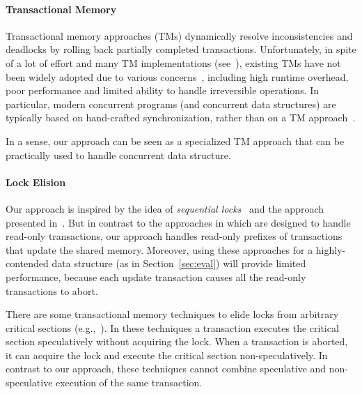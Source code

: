 \paragraph{Transactional Memory}
Transactional memory approaches (TMs) dynamically resolve inconsistencies
and deadlocks by rolling back partially completed transactions.
%
Unfortunately, in spite of a lot of effort and many TM implementations (see~\cite{HLR:SLCA2010}), existing TMs
have not been widely adopted due to various concerns~\cite{DuffyTM2010,Cascaval:2008,mckenneyParallel}, including high runtime overhead,
poor performance and limited ability to handle irreversible operations.
In particular, modern concurrent programs (and concurrent data structures) are typically based on hand-crafted synchronization, rather than  on a TM approach~\cite{Ohad:OOPSLA11}.

In a sense, our approach can be seen as a specialized TM approach that can be practically used to handle concurrent data structure.


\paragraph{Lock Elision}
Our approach is inspired by the idea of \emph{sequential locks}~\cite{mckenneyParallel} and the approach presented in~\cite{Nakaike:2010}.
But  in contrast to the approaches in \cite{mckenneyParallel,Nakaike:2010} which are designed to handle read-only transactions,
our approach handles read-only prefixes of transactions that update the shared memory. 
Moreover, using these approaches for a highly-contended data structure (as in Section~\ref{sec:eval}) will provide limited performance, 
because each update transaction causes all the read-only transactions to abort.

There are some transactional memory techniques to elide locks from arbitrary critical sections (e.g.,~\cite{Rajwar:2002:TLE:635508.605399,Roy:2009:RSS:1519065.1519094,Afek:2014:SHL:2611462.2611482}).
In these techniques a transaction executes the critical section speculatively without acquiring the lock.
When a transaction is aborted, it can acquire the lock and execute the critical section non-speculatively.
In contrast to our approach, these techniques cannot combine speculative and non-speculative execution of the same transaction.






